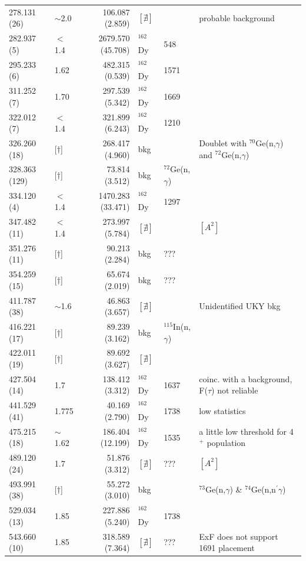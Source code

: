 \begin{landscape}
\begin{center}
\begin{longtable}{p{2.6cm}|p{1.2cm}|r|p{1.1cm}|p{2.0cm}|l}
   278.131 (26)  & $\sim$2.0 & 106.087 (2.859)& $[\nexists]$ && probable background\\ %
   282.937 (5)   & $<$1.4    & 2679.570 (45.708)& $^{162}$Dy & 548 &\\
   295.233 (6)   & 1.62      & 482.315 (0.539)& $^{162}$Dy & 1571 & \\
   311.252 (7)   & 1.70      & 297.539 (5.342)& $^{162}$Dy & 1669 & \\
   322.012 (7)   & $<$1.4    & 321.899 (6.243)& $^{162}$Dy & 1210 & \\
   326.260 (18)  & [$\dagger$] & 268.417 (4.960)& bkg & & Doublet with $^{70}$Ge(n,$\gamma$) and $^{72}$Ge(n,$\gamma$)\\
   328.363 (129) & [$\dagger$] &  73.814 (3.512)& bkg & $^{72}$Ge(n,$\gamma$) & \\
   334.120 (4)   & $<$1.4    &1470.283 (33.471)& $^{162}$Dy & 1297 & \\
   347.482 (11)  & $<$1.4    & 273.997 (5.784)& $[\nexists]$ & &$[A^2]$ \\
   351.276 (11)  & [$\dagger$] &  90.213 (2.284)& bkg & ??? & \\
   354.259 (15)  & [$\dagger$] &  65.674 (2.019)& bkg & ??? & \\
   411.787 (38)  & $\sim$1.6 &  46.863 (3.657)& $[\nexists]$ & & Unidentified UKY bkg \\
   416.221 (17)  & [$\dagger$] &  89.239 (3.162)& bkg & $^{115}$In(n,$\gamma$) & \\
   422.011 (19)  & [$\dagger$] &  89.692 (3.627)& $[\nexists]$ & & \\
   427.504 (14)  & 1.7       &  138.412 (3.312)& $^{162}$Dy & 1637 & coinc. with a background, F($\tau$) not reliable \\
   441.529 (41)  & 1.775     &  40.169 (2.790)& $^{162}$Dy & 1738 & low statistics \\
   475.215 (18)  & $\sim$1.62 &186.404 (12.199)& $^{162}$Dy & 1535 & a little low threshold for 4$^+$ population\\
   489.120 (24)  & 1.7        &51.876 (3.312)& $[\nexists]$ & ??? & $[A^2]$\\
   493.991 (38)  & [$\dagger$]  &55.272 (3.010)& bkg & & $^{73}$Ge(n,$\gamma$) \& $^{74}$Ge(n,n$^\prime\gamma$)\\
   529.034 (13)  & 1.85       &227.886 (5.240)& $^{162}$Dy & 1738 & \\
   543.660 (10)  & 1.85       &318.589 (7.364)& $[\nexists]$ & ??? & ExF does not support 1691 placement\\

\end{longtable}
\end{center}
\end{landscape}
